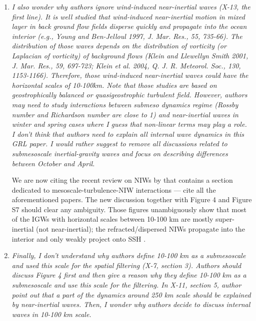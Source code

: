 \documentclass[11pt]{article}
\newcommand{\bdp}{\begin{description}}
\newcommand{\edp}{\end{description}}
\begin{document}
\begin{enumerate}
  \item {\it I also wonder why authors ignore wind-induced near-inertial waves (X-13, the first
        line). It is well studied that wind-induced near-inertial motion in mixed layer in back
        ground flow fields disperse quickly and propagate into the ocean interior (e.g., Young
        and Ben-Jelloul 1997, J. Mar. Res., 55, 735-66). The distribution of those waves
        depends on the distribution of vorticity (or Laplacian of vorticity) of background
        flows (Klein and Llewellyn Smith 2001, J. Mar. Res., 59, 697-723; Klein et al. 2004, Q.
        J. R. Meteorol. Soc., 130, 1153-1166). Therefore, those wind-induced near-inertial
        waves could have the horizontal scales of 10-100km. Note that those studies are based
        on geostrophically balanced or quasigeostrophic turbulent field. However, authors
        may need to study interactions between submeso dynamics regime (Rossby number
        and Richardson number are close to 1) and near-inertial waves in winter and spring
        cases where I guess that non-linear terms may play a role. I don't think that authors
        need to explain all internal wave dynamics in this GRL paper. I would rather suggest
        to remove all discussions related to submesoscale inertial-gravity waves and focus on
        describing differences between October and April.}\\

        \bdp
            We are now citing the recent review on NIWs by \cite{alford_etal2016} that contains
            a section dedicated to mesoscale-turbulence-NIW interactions ---  \cite{alford_etal2016}
            cite all the
            aforementioned papers. The new discussion together with Figure 4
            and Figure S7 should clear any ambiguity. Those figures unambiguously
            show that most of the IGWs with horizontal scales between 10-100 km
            are mostly super-inertial (not near-inertial); the refracted/dispersed  NIWs
            propagate into the interior and only weakly project onto SSH \citep{alford_etal2016}.
        \edp

  \item {\it Finally, I don't understand why authors define 10-100 km as a submesoscale and used
        this scale for the spatial filtering (X-7, section 3). Authors should discuss Figure 4 first
        and then give a reason why they define 10-100 km as a submesoscale and use this
        scale for the filtering. In X-11, section 5, author point out that a part of the dynamics
        around 250 km scale should be explained by near-inertial waves. Then, I wonder why
        authors decide to discuss internal waves in 10-100 km scale.}


\end{enumerate}
\end{document}
